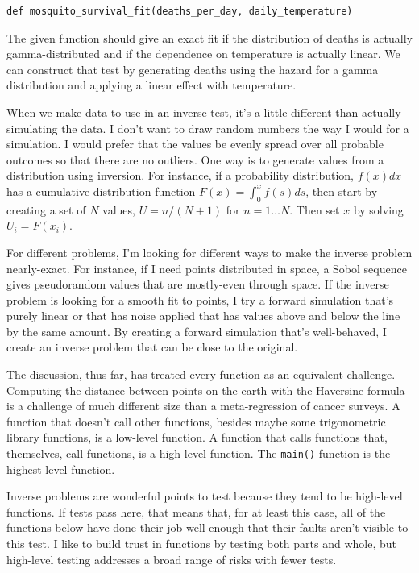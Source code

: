 \documentclass[fleqn,10pt]{olplainarticle}
\begin{document}
\begin{lstlisting}
def mosquito_survival_fit(deaths_per_day, daily_temperature)
\end{lstlisting}

\noindent{}The given function should give an exact fit if
the distribution of deaths is actually gamma-distributed and
if the dependence on temperature is actually linear. We can
construct that test by generating deaths using the hazard for
a gamma distribution and applying a linear effect with temperature.

When we make data to use in an inverse test, it's a little different
than actually simulating the data. I don't want to draw random
numbers the way I would for a simulation. I would prefer that
the values be evenly spread over all probable outcomes so that
there are no outliers. One way is to generate values from a
distribution using inversion. For instance, if a probability
distribution, $f(x)dx$ has a cumulative distribution function
$F(x) = \int_0^x f(s)ds$, then start by creating a set of $N$
values, $U=n / (N + 1)$ for $n=1\ldots N$. Then set $x$ by
solving $U_i = F(x_i)$.

For different problems, I'm looking for different ways to 
make the inverse problem nearly-exact. For instance, if I need
points distributed in space, a Sobol sequence gives pseudorandom
values that are mostly-even through space. If the inverse
problem is looking for a smooth fit to points, I try a forward
simulation that's purely linear or that has noise applied that
has values above and below the line by the same amount.
By creating a forward simulation that's well-behaved, I
create an inverse problem that can be close to the original.

The discussion, thus far, has treated every function as an
equivalent challenge. Computing the distance between points
on the earth with the Haversine formula is a challenge of much
different size than a meta-regression of cancer surveys.
A function that doesn't call other functions, besides maybe
some trigonometric library functions, is a low-level function.
A function that calls functions that, themselves, call functions,
is a high-level function. The \lstinline|main()| function is
the highest-level function.

Inverse problems are wonderful points to test because they
tend to be high-level functions. If tests pass here, that means
that, for at least this case, all of the functions below
have done their job well-enough that their faults aren't
visible to this test. I like to build trust in functions by
testing both parts and whole, but high-level testing addresses
a broad range of risks with fewer tests.
\end{document}
